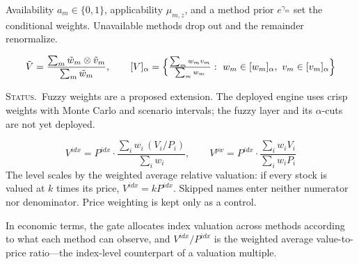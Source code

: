 \documentclass[10pt]{article}
\newcommand{\status}[1]{{\fontsize{20}{24}\selectfont\color{stone}\textsc{Status.}\ #1\par}}
\newcommand{\Vid}{V^{idx}}
\newcommand{\Pid}{P^{idx}}
\begin{document}
\begin{minipage}[t]{385.5mm}
Availability $a_m\in\{0,1\}$, applicability $\mu_{m,z}$, and a method prior
$e^{\gamma_m}$ set the conditional weights. Unavailable methods drop out and
the remainder renormalize.

\begin{equation}
\tilde{V}=\frac{\sum_m \tilde{w}_m\otimes\tilde{v}_m}{\sum_m\tilde{w}_m},
\qquad
[V]_\alpha=\Bigl\{\tfrac{\sum_m w_m v_m}{\sum_m w_m}:\ w_m\in[w_m]_\alpha,\ v_m\in[v_m]_\alpha\Bigr\}
\end{equation}
\status{Fuzzy weights are a proposed extension. The deployed engine uses crisp
weights with Monte Carlo and scenario intervals; the fuzzy layer and its
$\alpha$-cuts are not yet deployed.}

\begin{equation}
\Vid=\Pid\cdot\frac{\sum_i w_i\,(V_i/P_i)}{\sum_i w_i},
\qquad
V^{pw}=\Pid\cdot\frac{\sum_i w_iV_i}{\sum_i w_iP_i}
\end{equation}
The level scales by the weighted average relative valuation: if every stock is
valued at $k$ times its price, $\Vid=k\Pid$. Skipped names enter neither
numerator nor denominator. Price weighting is kept only as a control.

In economic terms, the gate allocates index valuation across methods according
to what each method can observe, and $\Vid/\Pid$ is the weighted average
value-to-price ratio---the index-level counterpart of a valuation multiple.

\begin{center}
\end{center}
\end{minipage}
\end{document}
